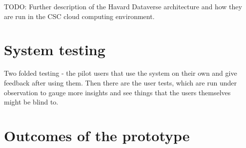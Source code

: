 TODO: Further description of the Havard Dataverse architecture and how they
are run in the CSC cloud computing environment.

\section{System testing}
\label{sec:system_testing}

Two folded testing - the pilot users that use the system on their own and give
feedback after using them. Then there are the user tests, which are run under
observation to gauge more insights and see things that the users themselves
might be blind to.

\section{Outcomes of the prototype}
\label{sec:prototype_outcomes}
